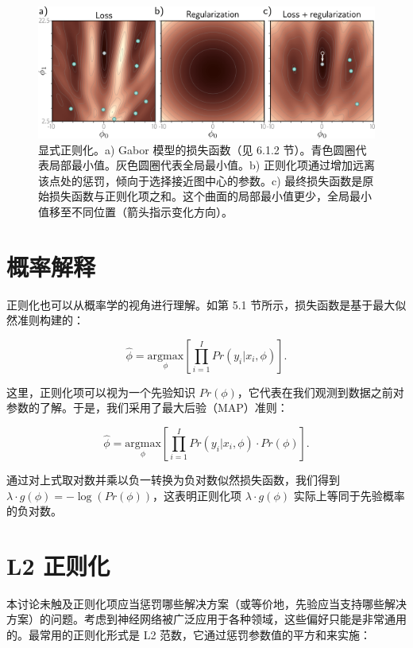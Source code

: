 \begin{figure}[ht!]
	\centering
	\includegraphics[width=0.7\linewidth]{png/chapter9/RegExplicitTheory.png}
	\caption{显式正则化。a) Gabor 模型的损失函数（见 6.1.2 节）。青色圆圈代表局部最小值。灰色圆圈代表全局最小值。b) 正则化项通过增加远离该点处的惩罚，倾向于选择接近图中心的参数。c) 最终损失函数是原始损失函数与正则化项之和。这个曲面的局部最小值更少，全局最小值移至不同位置（箭头指示变化方向）。}
\end{figure}


\section{概率解释}

正则化也可以从概率学的视角进行理解。如第 5.1 节所示，损失函数是基于最大似然准则构建的：

\begin{equation}
\hat{\phi} = \underset{\phi}{\mathrm{argmax}} \left[ \prod_{i=1}^I Pr(y_i | x_i, \phi) \right]. 
\end{equation}

这里，正则化项可以视为一个先验知识 \(Pr(\phi)\)，它代表在我们观测到数据之前对参数的了解。于是，我们采用了最大后验（MAP）准则：

\begin{equation}
\hat{\phi} = \underset{\phi}{\mathrm{argmax}} \left[ \prod_{i=1}^I Pr(y_i | x_i, \phi) \cdot Pr(\phi) \right]. 
\end{equation}

通过对上式取对数并乘以负一转换为负对数似然损失函数，我们得到 \(\lambda \cdot g(\phi) = -\log(Pr(\phi))\)，这表明正则化项 \(\lambda \cdot g(\phi)\) 实际上等同于先验概率的负对数。

\section{L2 正则化}

本讨论未触及正则化项应当惩罚哪些解决方案（或等价地，先验应当支持哪些解决方案）的问题。考虑到神经网络被广泛应用于各种领域，这些偏好只能是非常通用的。最常用的正则化形式是 L2 范数，它通过惩罚参数值的平方和来实施：


